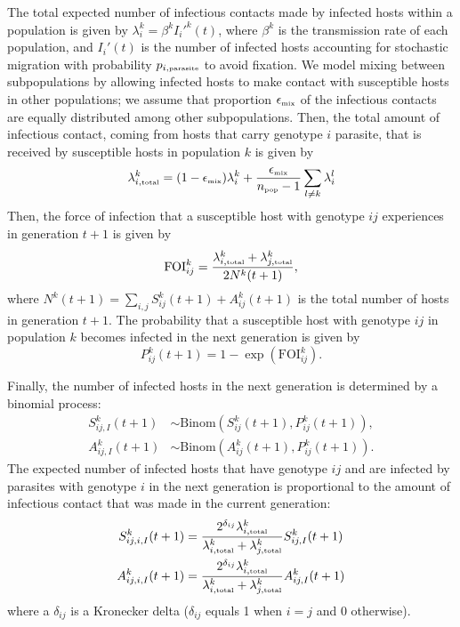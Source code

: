 \documentclass{article}\usepackage[]{graphicx}\usepackage[]{color}
\begin{document}
The total expected number of infectious contacts made by infected hosts within a population is given by $\lambda_i^k = \beta^k {I_i'}^k(t)$, where $\beta^k$ is the transmission rate of each population, and $I_i'(t)$ is the number of infected hosts accounting for stochastic migration with probability $p_{i, \textrm{\tiny parasite}}$ to avoid fixation. 
We model mixing between subpopulations by allowing infected hosts to make contact with susceptible hosts in other populations;
we assume that proportion $\epsilon_{\textrm{\tiny mix}}$ of the infectious contacts are equally distributed among other subpopulations.
Then, the total amount of infectious contact, coming from hosts that carry genotype $i$ parasite, that is received by susceptible hosts in population $k$ is given by
\begin{equation}
\lambda_{i, \textrm{\tiny total}}^k = (1 - \epsilon_{\textrm{\tiny mix}}) \lambda_i^k + \frac{\epsilon_{\textrm{\tiny mix}}}{n_\textrm{\tiny pop}-1} \sum_{l \neq k} \lambda_i^l
\end{equation}
Then, the force of infection that a susceptible host with genotype $ij$ experiences in generation $t+1$ is given by
\begin{equation}
\mathrm{FOI}_{ij}^k = \frac{\lambda_{i, \textrm{\tiny total}}^k  + \lambda_{j, \textrm{\tiny total}}^k}{2 N^k(t+1)},
\end{equation}
where $N^k(t+1) = \sum_{i,j} S_{ij}^k(t+1) + A_{ij}^k(t+1)$ is the total number of hosts in generation $t+1$.
The probability that a susceptible host with genotype $ij$ in population $k$ becomes infected in the next generation is given by
\begin{equation}
P_{ij}^k(t+1) = 1 - \exp\left(\mathrm{FOI}_{ij}^k\right).
\end{equation}

Finally, the number of infected hosts in the next generation is determined by a binomial process:
\begin{equation}
\begin{aligned}
S_{ij,I}^k (t+1) &\sim \mathrm{Binom}\left(S_{ij}^k (t+1), P_{ij}^k(t+1)\right),\\
A_{ij,I}^k (t+1) &\sim \mathrm{Binom}\left(A_{ij}^k (t+1), P_{ij}^k(t+1)\right).
\end{aligned}
\end{equation}
The expected number of infected hosts that have genotype $ij$ and are infected by parasites with genotype $i$ in the next generation is proportional to the amount of infectious contact that was made in the current generation:
\begin{equation}
\begin{aligned}
S_{ij,i,I}^k(t+1) &=  \frac{2^{\delta_{ij}} \lambda_{i, \textrm{\tiny total}}^k}{\lambda_{i, \textrm{\tiny total}}^k + \lambda_{j, \textrm{\tiny total}}^k} S_{ij,I}^k(t+1)\\
A_{ij,i,I}^k(t+1) &=  \frac{2^{\delta_{ij}} \lambda_{i, \textrm{\tiny total}}^k}{\lambda_{i, \textrm{\tiny total}}^k + \lambda_{j, \textrm{\tiny total}}^k} A_{ij,I}^k(t+1)
\end{aligned}
\end{equation}
where a $\delta_{ij}$ is a Kronecker delta ($\delta_{ij}$ equals 1 when $i = j$ and 0 otherwise).
\end{document}
